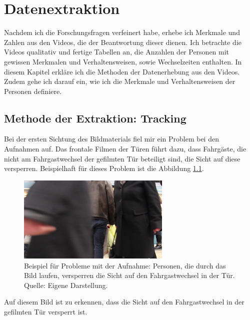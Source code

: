 \chapter{Datenextraktion} \label{Datenerhebung}
Nachdem ich die Forschungsfragen verfeinert habe, erhebe ich Merkmale und Zahlen aus den Videos, die der Beantwortung dieser dienen. Ich betrachte die Videos qualitativ und fertige Tabellen an, die Anzahlen der Personen mit gewissen Merkmalen und Verhaltensweisen, sowie Wechselzeiten enthalten. In diesem Kapitel erkläre ich die Methoden der Datenerhebung aus den Videos. Zudem gehe ich darauf ein, wie ich die Merkmale und Verhaltensweisen der Personen definiere.
\section{Methode der Extraktion: Tracking}\label{Tracking}
Bei der ersten Sichtung des Bildmaterials fiel mir ein Problem bei den Aufnahmen auf. Das frontale Filmen der Türen führt dazu, dass Fahrgäste, die nicht am Fahrgastwechsel der gefilmten Tür beteiligt sind, die Sicht auf diese versperren. Beispielhaft für dieses Problem ist die Abbildung \ref{fig:Problem bei Videos}.
\begin{figure}[H]
	\centering
		\includegraphics[width=0.65\textwidth]{pictures/data_extraction/tracking/problem.jpg}
	\caption{Beispiel für Probleme mit der Aufnahme: Personen, die durch das Bild laufen, versperren die Sicht auf den Fahrgastwechsel in der Tür. Quelle: Eigene Darstellung.}
	\label{fig:Problem bei Videos}
\end{figure} 
Auf diesem Bild ist zu erkennen, dass die Sicht auf den Fahrgastwechsel in der gefilmten Tür versperrt ist.\\
